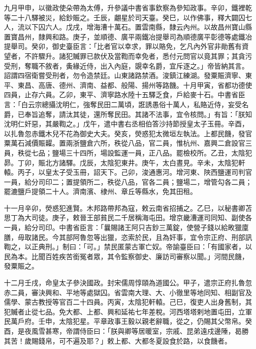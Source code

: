 \begin{pinyinscope}
 九月甲申，以徽政使朵帶為太傅，升參議中書省事欽察為參知政事。辛卯，鐵裡乾等二十八驛被災，給鈔賑之。壬辰，翽星於司天臺。癸巳，以作佛事，釋大闢囚七人，流以下囚六人。戊戌，增海漕十萬石。置雲南縣，隸云內州。以故昌州寶山縣置寶昌州，隸興和路。庚子，並順德、廣平兩鐵冶提舉司為順德廣平彰德等處鐵冶提舉司。癸卯，御史臺臣言：「比者官以幸求，罪以賂免，乞凡內外官非勛舊有資望者，不許驟升。諸犯贓罪已款伏及當鞫而幸免者，悉付元問官以竟其罪；其貪污受刑，奪職不敘者，夤緣近侍，出入內庭，覬幸名爵，宜斥逐之。」帝皆納其言。詔謂四宿衛嘗受刑者，勿令造禁廷。山東諸路禁酒。浚鎮江練湖。發粟賑濟寧、東平、東昌、高唐、德州、濟南、益都、般陽、揚州等路饑。十月甲寅，省都功德使四員，止存六員。乙卯，東平、濟寧路水陸十五驛乏食，戶給麥十石。中書省臣言：「白云宗總攝沈明仁，強奪民田二萬頃，誑誘愚俗十萬人，私賂近侍，妄受名爵，已奉旨追奪，請汰其徒，還所奪民田。其諸不法事，宜令核問。」有旨：「朕知沈明仁奸惡，其嚴鞫之。」戊午，遣中書右丞相伯答沙持節授皇太子玉冊。辛酉，以扎魯忽赤鐵木兒不花為御史大夫。癸亥，熒惑犯太微垣左執法。上都民饑，發官粟萬石減價賑糶。置兩浙鹽倉六所，秩從八品，官二員，惟杭州、嘉興二倉設官三員，秩從七品；鹽場三十四所，場設監運一員，正八品。罷檢校所。乙丑，太陰犯昴。丁卯，賑北方諸驛。戊辰，太陰犯東井。庚午，太白晝見。辛未，太陰犯軒轅。丙子，以皇太子受玉冊，詔天下。己卯，浚通惠河。增河東、陜西鹽運司判官一員，給分司印二；置提領所二，秩從八品，官各二員；鹽場二，增管勾各二員；罷漉鹽戶提領二十人。濟南濱、棣州、章丘等縣水，免其田租。



 十一月辛卯，熒惑犯進賢。木邦路帶邦為寇，敕云南省招捕之。乙巳，以秘書卿苫思丁為大司徒。庚子，敕晉王部貧民二千居稱海屯田。增京畿漕運司同知、副使各一員，給分司印。中書省臣言：「曩賜諸王阿只吉鈔三萬錠，使營子錢以給畋獵廩膳，毋取諸民。今其部阿魯忽等出獵，恣索於民，且為奸事，宜令宗正府、刑部訊鞫之，以正典刑。」制曰：「可。」禁民匿蒙古軍亡奴。帝諭臺臣曰：「有國家者，以民為本。比聞百姓疾苦銜冤者眾，其令監察御史、廉訪司審察以聞。」河間民饑，發粟賑之。



 十二月壬戌，命皇太子參決國政。封宋儒周惇頤為道國公。甲子，遣宗正府扎魯忽赤二員，審決興和、平地等處獄囚。省雲南大理、大、小徹里等地同知、相副官及儒學、蒙古教授等官百二十四員。丙寅，太陰犯軒轅。己巳，復吏人出身舊制，其犯贓者止從七品。免大都、上都、興和延祐七年差稅。河西塔塔剌地置屯田，立軍民萬戶府。壬申，太陰犯星。平章政事王毅以親老辭職，從之，仍賜其父幣帛。癸酉，是夜風雪甚寒，帝謂侍臣曰：「朕與卿等居暖室，宗戚、昆弟遠戍邊陲，曷勝其苦！歲賜錢帛，可不遍及耶？」敕上都、大都冬夏設食於路，以食饑者。




\end{pinyinscope}
